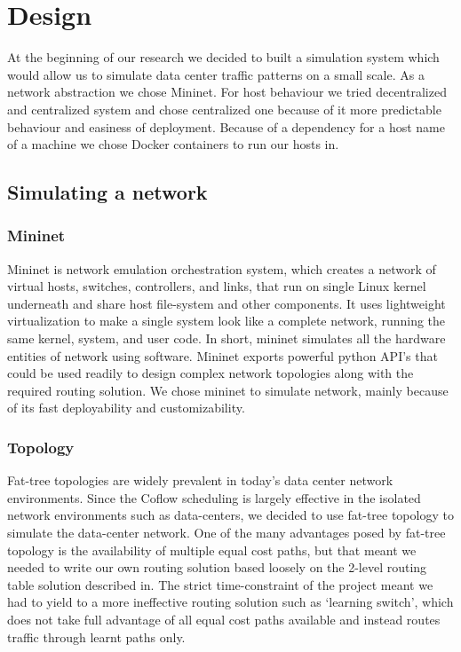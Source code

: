\documentclass[conference]{IEEEtran}
\begin{document}
\section{Design}

At the beginning of our research we decided to built a simulation system which would allow us to simulate data center traffic patterns on a small scale. As a network abstraction we chose Mininet. For host behaviour we tried decentralized and centralized system and chose centralized one because of it more predictable behaviour and easiness of deployment. Because of a dependency for a host name of a machine we chose Docker containers to run our hosts in.

\subsection{Simulating a network}
\subsubsection{Mininet}
Mininet is network emulation orchestration system, which creates a network of virtual hosts, switches, controllers, and links, that run on single Linux kernel underneath and share host file-system and other components. It uses lightweight virtualization to make a single system look like a complete network, running the same kernel, system, and user code. In short, mininet simulates all the hardware entities of network using software. Mininet exports powerful python API’s that could be used readily to design complex network topologies along with the required routing solution. We chose mininet to simulate network, mainly because of its fast deployability and customizability.

\subsubsection{Topology}
Fat-tree topologies are widely prevalent in today’s data center network environments. Since the Coflow scheduling is largely effective in the isolated network environments such as data-centers, we decided to use fat-tree topology to simulate the data-center network. One of the many advantages posed by fat-tree topology is the availability of multiple equal cost paths, but that meant we needed to write our own routing solution based loosely on the 2-level routing table solution described in. The strict time-constraint of the project meant we had to yield to a more ineffective routing solution such as ‘learning switch’, which does not take full advantage of all equal cost paths available and instead routes traffic through learnt paths only. 
\end{document}
